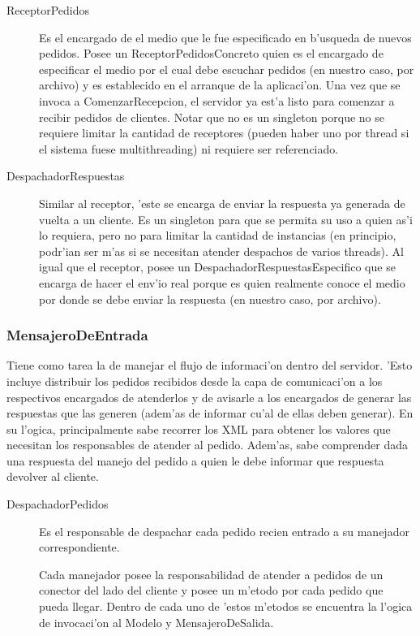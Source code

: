 \begin{description}
\item[ReceptorPedidos] Es el encargado de  el medio que le fue especificado en b'usqueda de nuevos pedidos. Posee un ReceptorPedidosConcreto quien es el encargado de especificar el medio por el cual debe escuchar pedidos (en nuestro caso, por archivo) y es establecido en el arranque de la aplicaci'on. Una vez que se invoca a ComenzarRecepcion, el servidor ya est'a listo para comenzar a recibir pedidos de clientes. Notar que no es un singleton porque no se requiere limitar la cantidad de receptores (pueden haber uno por thread si el sistema fuese multithreading) ni requiere ser referenciado. 
\item[DespachadorRespuestas] Similar al receptor, 'este se encarga de enviar la respuesta ya generada de vuelta a un cliente. Es un singleton para que se permita su uso a quien as'i lo requiera, pero no para limitar la cantidad de instancias (en principio, podr'ian ser m'as si se necesitan atender despachos de varios threads). Al igual que el receptor, posee un DespachadorRespuestasEspecifico que se encarga de hacer el env'io real porque es quien realmente conoce el medio por donde se debe enviar la respuesta (en nuestro caso, por archivo).
\end{description}


\subsubsection{MensajeroDeEntrada}
Tiene como tarea la de manejar el flujo de informaci'on dentro del servidor. 'Esto incluye distribuir los pedidos recibidos desde la capa de comunicaci'on a los respectivos encargados de atenderlos y de avisarle a los encargados de generar las respuestas que las generen (adem'as de informar cu'al de ellas deben generar). En su l'ogica, principalmente sabe recorrer los XML para obtener los valores que necesitan los responsables de atender al pedido. Adem'as, sabe comprender dada una respuesta del manejo del pedido a quien le debe informar que respuesta devolver al cliente.


\begin{description}
\item[DespachadorPedidos] Es el responsable de despachar cada pedido recien entrado a su manejador correspondiente.
\item[] Cada manejador posee la responsabilidad de atender a pedidos de un conector del lado del cliente y posee un m'etodo por cada pedido que pueda llegar. Dentro de cada uno de 'estos m'etodos se encuentra la l'ogica de invocaci'on al Modelo y MensajeroDeSalida.
\end{description}


